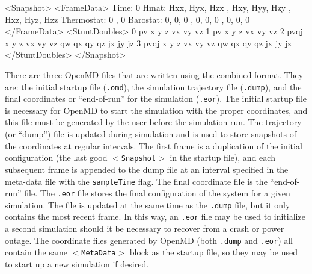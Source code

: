 \documentclass[]{book}
\begin{document}
\begin{code}[caption={[The format of the {\tt $<$Snapshot$>$} block]
An example of the format of the {\tt $<$Snapshot$>$} block.  There is an
initial sub-block called {\tt $<$FrameData$>$} which contains the time
stamp, the three column vectors of $\mathsf{H}$, and optional extra
information for the extended sytem ensembles.  The lines in the {\tt
$<$StuntDoubles$>$} sub-block provide information about the instantaneous
configuration of each integrable object.  For each integrable object,
the global index is followed by a short string describing what
additional information is present on the line.  Atoms with only
position and velocity information use the {\tt pv} string which must
then be followed by the position and velocity vectors for that atom.
Directional atoms and Rigid Bodies typically use the {\tt pvqj} string
which is followed by position, velocity, quaternions, and
lastly, body fixed angular momentum for that integrable object.},label={sch:dumpFormat}]
  <Snapshot>
    <FrameData>
        Time: 0
        Hmat: {{ Hxx, Hyx, Hzx }, { Hxy, Hyy, Hzy }, { Hxz, Hyz, Hzz }}
  Thermostat: 0 , 0
    Barostat: {{ 0, 0, 0 }, { 0, 0, 0 }, { 0, 0, 0 }}
    </FrameData>
    <StuntDoubles>
         0      pv          x y z vx vy vz
         1      pv          x y z vx vy vz
         2      pvqj        x y z vx vy vz  qw qx qy qz jx jy jz
         3      pvqj        x y z vx vy vz  qw qx qy qz jx jy jz
    </StuntDoubles>
  </Snapshot>
\end{code}

There are three {\sc OpenMD} files that are written using the combined
format.  They are: the initial startup file (\texttt{.omd}), the
simulation trajectory file (\texttt{.dump}), and the final coordinates
or ``end-of-run'' for the simulation (\texttt{.eor}). The initial
startup file is necessary for {\sc OpenMD} to start the simulation with
the proper coordinates, and this file must be generated by the user
before the simulation run. The trajectory (or ``dump'') file is
updated during simulation and is used to store snapshots of the
coordinates at regular intervals. The first frame is a duplication of
the initial configuration (the last good {\tt $<$Snapshot$>$} in the
startup file), and each subsequent frame is appended to the dump file
at an interval specified in the meta-data file with the
\texttt{sampleTime} flag. The final coordinate file is the
``end-of-run'' file.  The \texttt{.eor} file stores the final
configuration of the system for a given simulation. The file is
updated at the same time as the \texttt{.dump} file, but it only
contains the most recent frame. In this way, an \texttt{.eor} file may
be used to initialize a second simulation should it be necessary to
recover from a crash or power outage. The coordinate files generated
by {\sc OpenMD} (both \texttt{.dump} and \texttt{.eor}) all contain the
same {\tt $<$MetaData$>$} block as the startup file, so they may be
used to start up a new simulation if desired.
\end{document}
